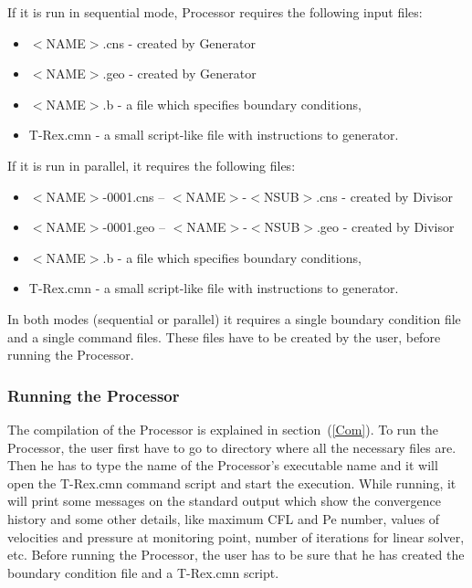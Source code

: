 \documentclass[10pt]{article}
\newcommand*{\tc}{\ttfamily} %
\newcommand*{\tn}{\sffamily} %
\begin{document}
    If it is run in sequential mode, {\tn Processor} requires the 
    following input files:
    \begin{itemize} 
      \item {\tc $<$NAME$>$.cns} - created by {\tn Generator}
      \item {\tc $<$NAME$>$.geo} - created by {\tn Generator}
      \item {\tc $<$NAME$>$.b} - a file which specifies boundary
            conditions, 
      \item {\tc T-Rex.cmn} - a small script-like file with 
            instructions to generator. 
    \end{itemize}    
    If it is run in parallel, it requires the following files:
    \begin{itemize} 
      \item {\tc $<$NAME$>$-0001.cns} -- {\tc $<$NAME$>$-$<$NSUB$>$.cns} 
            - created by {\tn Divisor}
      \item {\tc $<$NAME$>$-0001.geo} -- {\tc $<$NAME$>$-$<$NSUB$>$.geo} 
            - created by {\tn Divisor}
      \item {\tc $<$NAME$>$.b} - a file which specifies boundary
            conditions, 
      \item {\tc T-Rex.cmn} - a small script-like file with 
            instructions to generator. 
    \end{itemize}    
    In both modes (sequential or parallel) it requires a single
    boundary condition file and a single command files. These files
    have to be created by the user, before running the 
    {\tn Processor}. 

    \subsubsection{Running the {\tn Processor}}

    The compilation of the {\tn Processor} is explained in
    section~(\ref{Com}).
    To run the {\tn Processor}, the user first have to go 
    to directory where all the necessary files are. Then he has
    to type the name of the {\tn Processor}'s executable name
    and it will open the {\tc T-Rex.cmn} command script and 
    start the execution. While running, it will print some 
    messages on the standard output which show the convergence history
    and some other details, like maximum CFL and Pe number,
    values of velocities and pressure at monitoring point,
    number of iterations for linear solver, etc. Before running
    the {\tn Processor}, the user has to be sure that he has created
    the boundary condition file and a {\tc T-Rex.cmn} script.
    
\end{document}
